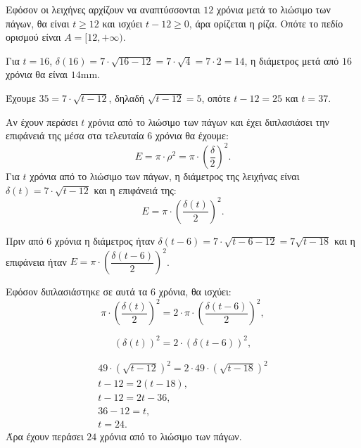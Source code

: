 
\begin{alist}
\item Εφόσον οι λειχήνες αρχίζουν να αναπτύσσονται $12$ χρόνια μετά το λιώσιμο των πάγων, θα είναι $t \ge 12$ και ισχύει $t - 12 \ge 0$, άρα ορίζεται η ρίζα. Οπότε το πεδίο ορισμού είναι $A = [12, +\infty)$.

\item Για $t = 16$, $\delta(16) = 7 \cdot \sqrt{16 - 12} = 7 \cdot \sqrt{4} = 7 \cdot 2 = 14$, η διάμετρος μετά από $16$ χρόνια θα είναι $14\text{mm}$.

\item Έχουμε $35 = 7 \cdot \sqrt{t - 12}$, δηλαδή $\sqrt{t - 12} = 5$, οπότε $t - 12 = 25$ και $t = 37$.

\item Αν έχουν περάσει $t$ χρόνια από το λιώσιμο των πάγων και έχει διπλασιάσει την επιφάνειά της μέσα στα τελευταία $6$ χρόνια θα έχουμε:
\[E = \pi \cdot \rho^2 = \pi \cdot \left(\dfrac{\delta}{2}\right)^2.\]
Για $t$ χρόνια από το λιώσιμο των πάγων, η διάμετρος της λειχήνας είναι $\delta(t) = 7 \cdot \sqrt{t - 12}$ και η επιφάνειά της:
\[E = \pi \cdot \left(\dfrac{\delta(t)}{2}\right)^2.\]

Πριν από $6$ χρόνια η διάμετρος ήταν $\delta(t - 6) = 7 \cdot \sqrt{t - 6 - 12} = 7\sqrt{t - 18}$ και η επιφάνεια ήταν $E = \pi \cdot \left(\dfrac{\delta(t - 6)}{2}\right)^2$.

Εφόσον διπλασιάστηκε σε αυτά τα $6$ χρόνια, θα ισχύει:
\[\pi \cdot \left(\dfrac{\delta(t)}{2}\right)^2 = 2 \cdot \pi \cdot \left(\dfrac{\delta(t - 6)}{2}\right)^2,\]

\[(\delta(t))^2 = 2 \cdot (\delta(t - 6))^2,\]

\begin{gather*}
49 \cdot (\sqrt{t - 12})^2 = 2 \cdot 49 \cdot (\sqrt{t - 18})^2 \\
t - 12 = 2(t - 18), \\
t - 12 = 2t - 36, \\
36 - 12 = t, \\
t = 24.
\end{gather*}
Άρα έχουν περάσει $24$ χρόνια από το λιώσιμο των πάγων.
\end{alist}

